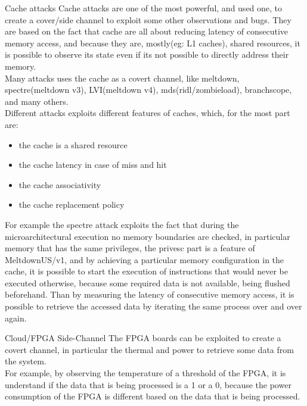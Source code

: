\begin{section}{Cache attacks}
  Cache attacks are one of the most powerful, and used one, to create a cover/side channel to exploit some
  other observations and bugs. They are based on the fact that cache are all about reducing latency
  of consecutive memory access, and because they are, mostly(eg: L1 caches), shared resources, it is
  possible to observe its state even if its not possible to directly address their memory.\\
  Many attacks uses the cache as a covert channel, like meltdown, spectre(meltdown v3), LVI(meltdown
  v4), mds(ridl/zombieload), branchscope, and many others.\\
  Different attacks exploits different features of caches, which, for the most part are:
  \begin{itemize}
    \item the cache is a shared resource
    \item the cache latency in case of miss and hit
    \item the cache associativity
    \item the cache replacement policy
  \end{itemize}
  For example the spectre attack exploits the fact that during the microarchitectural execution no
  memory boundaries are checked, in particular memory that has the same privileges, the privesc part
  is a feature of MeltdownUS/v1, and by achieving a particular memory configuration in the cache, it
  is possible to start the execution of instructions that would never be executed otherwise, because
  some required data is not available, being flushed beforehand. Than by measuring the latency of
  consecutive memory access, it is possible to retrieve the accessed data by iterating the same
  process over and over again.\\

\end{section}

\begin{section}{Cloud/FPGA Side-Channel}
  The FPGA boards can be exploited to create a covert channel, in particular the thermal and power
  to retrieve some data from the system.\\
  For example, by observing the temperature of a threshold of the FPGA, it is understand if the data
  that is being processed is a 1 or a 0, because the power consumption of the FPGA is different
  based on the data that is being processed.\\
\end{section}

